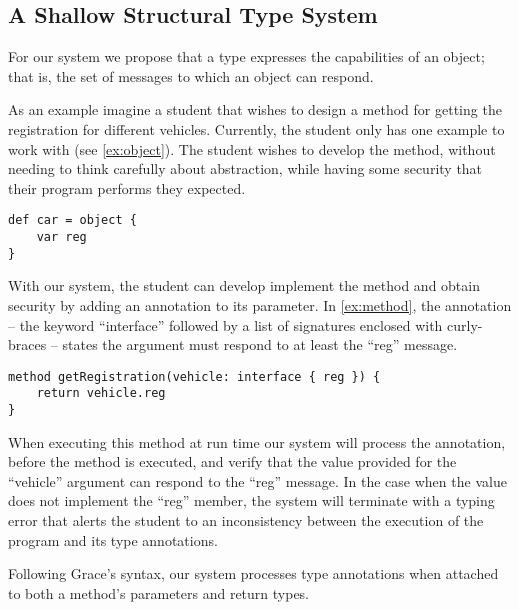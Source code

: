 \subsection{A Shallow Structural Type System}




For our system we propose that a type expresses the capabilities of an object;
that is, the set of messages to which an object can respond.

As an example imagine a student that wishes to 
design a method for getting the registration for different vehicles. 
Currently, the student only has one example to work with (see \cref{ex:object}).
The student wishes to develop the method,
without needing to think carefully about abstraction,
while having some security that their program
performs they expected.

\begin{lstlisting}[label={ex:object},caption={An object literal with a field named ``reg'' and assigns it to the ``car'' variable.}]
def car = object {
    var reg
}
\end{lstlisting}

With our system, the student can develop implement the method and 
obtain security by adding an annotation to its parameter. 
In \cref{ex:method}, the annotation
-- the keyword ``interface'' followed by a list of signatures enclosed with curly-braces --
states the argument must respond to at least the ``reg'' message. 

\begin{lstlisting}[label={ex:method},caption={A method with its argument annotated with an interface literal, stating that the value must respond to at least the ``reg'' message.}]
method getRegistration(vehicle: interface { reg }) {
    return vehicle.reg
}
\end{lstlisting}

When executing this method at run time
our system will process the annotation,
before the method is executed,
and verify that the value provided for the ``vehicle'' argument 
can respond to the ``reg'' message.
In the case when the value does not implement the ``reg'' member,
the system will terminate with a typing error 
that alerts the student to an inconsistency between the
execution of the program and its type annotations.



Following Grace's syntax, our system processes type annotations when attached
to both a method's parameters and return types. 

